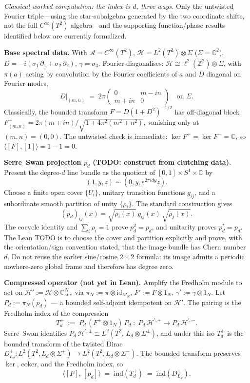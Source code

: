 \documentclass[
  11pt,
]{article}
\begin{document}
\emph{Classical worked computation: the index is \(d\), three ways.}
Only the untwisted Fourier triple---using the star-subalgebra generated by the two
coordinate shifts, not the full \(C^\infty(T^2)\) algebra---and the supporting
function/phase results identified below are currently formalized.

\textbf{Base spectral data.} With \(\mathcal{A}= C^\infty(T^2)\),
\(\mathcal{H}= L^2(T^2) \otimes \Sigma\) (\(\Sigma = \mathbb{C}^2\)),
\(D = -i(\sigma_1\,\partial_1 + \sigma_2\,\partial_2)\),
\(\gamma = \sigma_3\). Fourier diagonalises:
\(\mathcal{H}\cong \ell^2(\mathbb{Z}^2) \otimes \Sigma\), with
\(\pi(a)\) acting by convolution by the Fourier coefficients of \(a\)
and \(D\) diagonal on Fourier modes, \[
D|_{(m, n)} \;=\; 2\pi \begin{pmatrix} 0 & m - in \\ m + in & 0 \end{pmatrix}
\quad \text{on } \Sigma.
\] Classically, the bounded transform \(F = D(1 + D^2)^{-1/2}\) has off-diagonal
block \(F^+_{(m, n)} = 2\pi(m + in)/\sqrt{1 + 4\pi^2(m^2 + n^2)}\),
vanishing only at \((m, n) = (0, 0)\). The untwisted check is immediate:
\(\ker F^+ = \ker F^- = \mathbb{C}\), so
\(\langle [F], [1]\rangle = 1 - 1 = 0\).

\textbf{Serre--Swan projection \(p_d\) (TODO: construct from clutching
data).} Present the degree-\(d\) line bundle as the quotient of
\([0,1]\times S^1\times\mathbb{C}\) by
\[
(1,y,z)\sim(0,y,e^{2\pi i d y}z).
\]
Choose a finite open cover \(\{U_i\}\), unitary transition functions
\(g_{ij}\), and a subordinate smooth partition of unity \(\{\rho_i\}\).
The standard construction gives
\[
(p_d)_{ij}(x)=\sqrt{\rho_i(x)}\,g_{ij}(x)\,\sqrt{\rho_j(x)}.
\]
The cocycle identity and \(\sum_i\rho_i=1\) prove \(p_d^2=p_d\), and
unitarity proves \(p_d^*=p_d\). The Lean TODO is to choose the cover and
partition explicitly and prove, with the orientation/sign convention
stated, that the image bundle has Chern number \(d\). Do not reuse the earlier sine/cosine \(2\times2\) formula: its
image admits a periodic nowhere-zero global frame and therefore has
degree zero.

\textbf{Compressed operator (not yet in Lean).} Amplify the Fredholm module to act on
\(\mathcal{H}' := \mathcal{H}\otimes \mathbb{C}^N_{\mathrm{aux}}\) via
\(\pi_N := \pi \otimes \mathrm{id}_{M_N}\), \(F' := F \otimes 1_N\),
\(\gamma' := \gamma \otimes 1_N\). Let \(P_d := \pi_N(p_d)\) --- a bounded
self-adjoint idempotent on \(\mathcal{H}'\). The pairing is the Fredholm
index of the compression \[
T_d^+ \;:=\; P_d\,(F^+ \otimes 1_N)\,P_d \;\colon\; P_d\,\mathcal{H}^{\prime,+} \to P_d\,\mathcal{H}^{\prime,-}.
\] Serre--Swan identifies
\(P_d\,\mathcal{H}^{\prime,\pm} \cong L^2(T^2,\,L_d \otimes \Sigma^\pm)\),
and under this iso \(T_d^+\) is the bounded transform of the twisted
Dirac
\(D_{L_d}^+ \colon L^2(T^2, L_d \otimes \Sigma^+) \to L^2(T^2, L_d \otimes \Sigma^-).\)
The bounded transform preserves \(\ker\), \(\mathrm{coker}\), and the
Fredholm index, so \[
\bigl\langle [F],\,[p_d] \bigr\rangle \;=\; \mathrm{ind}(T_d^+) \;=\; \mathrm{ind}(D_{L_d}^+).
\]
\end{document}
